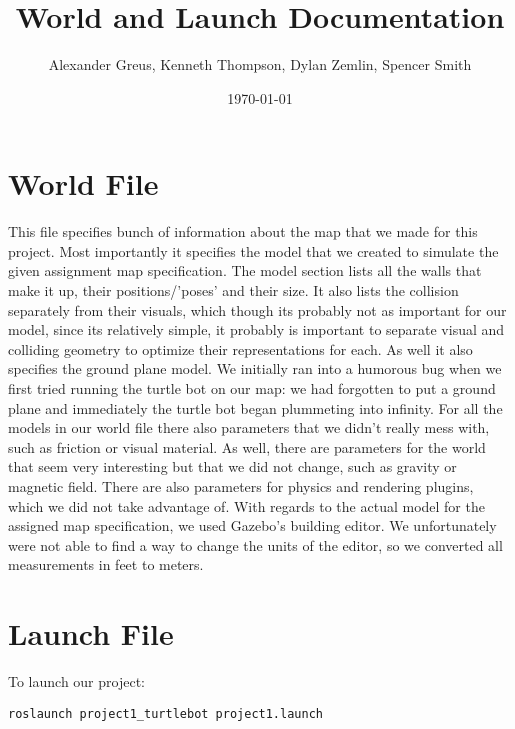 \documentclass[12pt]{article}
\title{World and Launch Documentation}
\author{Alexander Greus, Kenneth Thompson, Dylan Zemlin, Spencer Smith}
\date{\today}
\begin{document}
\maketitle

\part*{World File}
This file specifies bunch of information about the map that we made for this project. Most importantly it specifies the model that we created to simulate the given assignment map specification. The model section lists all the walls that make it up, their positions/'poses' and their size. It also lists the collision separately from their visuals, which though its probably not as important for our model, since its relatively simple, it probably is important to separate visual and colliding geometry to optimize their representations for each. As well it also specifies the ground plane model. We initially ran into a humorous bug when we first tried running the turtle bot on our map: we had forgotten to put a ground plane and immediately the turtle bot began plummeting into infinity. For all the models in our world file there also parameters that we didn't really mess with, such as friction or visual material. As well, there are parameters for the world that seem very interesting but that we did not change, such as gravity or magnetic field. There are also parameters for physics and rendering plugins, which we did not take advantage of. With regards to the actual model for the assigned map specification, we used Gazebo's building editor. We unfortunately were not able to find a way to change the units of the editor, so we converted all measurements in feet to meters.

\part*{Launch File}
To launch our project:
\begin{lstlisting}
roslaunch project1_turtlebot project1.launch
\end{lstlisting}
\end{document}
